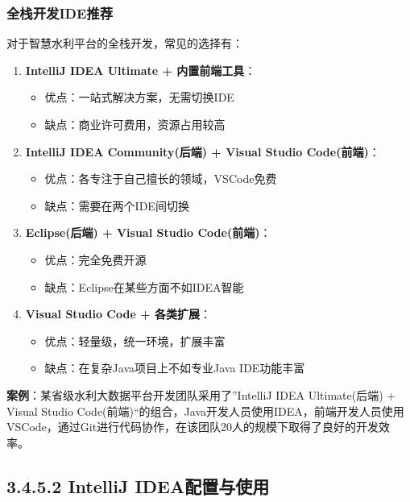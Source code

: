 \subsubsection{全栈开发IDE推荐}\label{ux5168ux6808ux5f00ux53d1ideux63a8ux8350}

对于智慧水利平台的全栈开发，常见的选择有：

\begin{enumerate}
\def\labelenumi{\arabic{enumi}.}
\tightlist
\item
  \textbf{IntelliJ IDEA Ultimate + 内置前端工具}：

  \begin{itemize}
  \tightlist
  \item
    优点：一站式解决方案，无需切换IDE
  \item
    缺点：商业许可费用，资源占用较高
  \end{itemize}
\item
  \textbf{IntelliJ IDEA Community(后端) + Visual Studio Code(前端)}：

  \begin{itemize}
  \tightlist
  \item
    优点：各专注于自己擅长的领域，VSCode免费
  \item
    缺点：需要在两个IDE间切换
  \end{itemize}
\item
  \textbf{Eclipse(后端) + Visual Studio Code(前端)}：

  \begin{itemize}
  \tightlist
  \item
    优点：完全免费开源
  \item
    缺点：Eclipse在某些方面不如IDEA智能
  \end{itemize}
\item
  \textbf{Visual Studio Code + 各类扩展}：

  \begin{itemize}
  \tightlist
  \item
    优点：轻量级，统一环境，扩展丰富
  \item
    缺点：在复杂Java项目上不如专业Java IDE功能丰富
  \end{itemize}
\end{enumerate}

\textbf{案例}：某省级水利大数据平台开发团队采用了''IntelliJ IDEA
Ultimate(后端) + Visual Studio
Code(前端)``的组合，Java开发人员使用IDEA，前端开发人员使用VSCode，通过Git进行代码协作，在该团队20人的规模下取得了良好的开发效率。

\subsection{3.4.5.2 IntelliJ
IDEA配置与使用}\label{intellij-ideaux914dux7f6eux4e0eux4f7fux7528}


